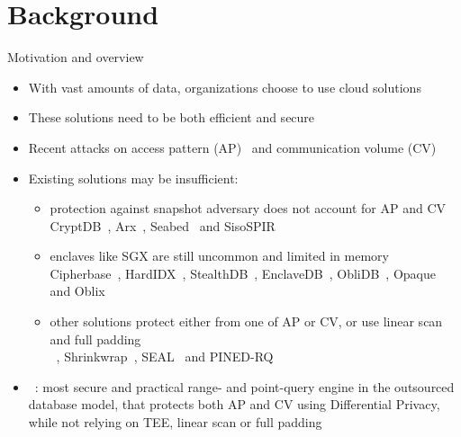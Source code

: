
\newlength{\listLabelLength}

\section{Background}

	\begin{frame}{Motivation and overview}

		\begin{itemize}
			\item<1-> With vast amounts of data, organizations choose to use cloud solutions
			\item<1-> These solutions need to be both efficient and secure
			\item<2-> Recent attacks on \alert{access pattern (AP)}~\cite{multidimensional-range-queries, inference-attack-islam-14, leakage-abuse-attacks-cash-15, inference-attacks-naveed-15, generic-attacks-kellaris, attacks-tao-of-inference, grubbs-attacks, access-pattern-disclosure, attacks-improved-reconstruction} and \alert{communication volume (CV)}~\cite{generic-attacks-kellaris, state-of-uniform, attacks-improved-reconstruction, pump-volume-attacks, volume-range-attacks}
			\item<3->
				Existing solutions may be insufficient:
				\begin{itemize}
					\item<1,2,3,6-> \normalsize
						protection against snapshot adversary does not account for AP and CV \\
						\small{CryptDB~\cite{crypt-db}, Arx~\cite{arx}, Seabed~\cite{seabed} and SisoSPIR~\cite{sisospir}}

					\item<1,2,4,6-> \normalsize
						enclaves like SGX are still uncommon and limited in memory \\
						\small{Cipherbase~\cite{cipherbase}, HardIDX~\cite{hardidx}, StealthDB~\cite{stealth-db}, EnclaveDB~\cite{enclave-db}, ObliDB~\cite{oblidb}, Opaque~\cite{opaque} and Oblix~\cite{oblix}}

					\item<1,2,5,6-> \normalsize
						other solutions protect either from one of AP or CV, or use linear scan and full padding \\
						\small{\crypte~\cite{crypte}, Shrinkwrap~\cite{shrinkwrap}, SEAL~\cite{seal} and PINED-RQ~\cite{pined-rq}}
				\end{itemize}
			\item<6-> \epsolute~\cite{epsolute}: most secure and practical range- and point-query engine in the outsourced database model, that protects both AP and CV using Differential Privacy, while not relying on TEE, linear scan or full padding
		\end{itemize}

	\end{frame}

